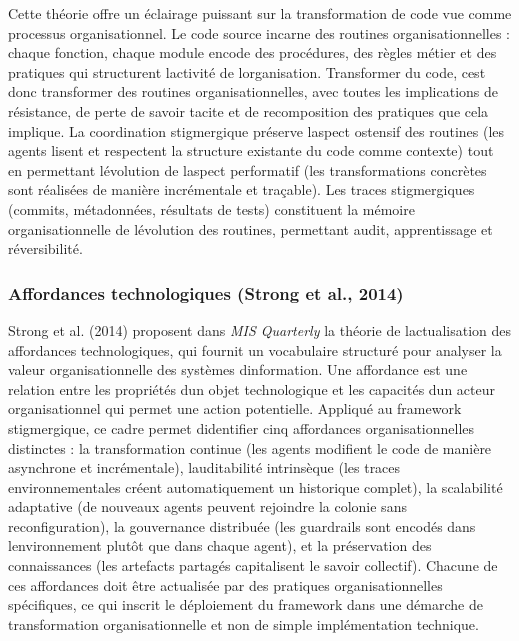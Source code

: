 \documentclass[12pt,a4paper]{article}
\begin{document}
Cette théorie offre un éclairage puissant sur la transformation de code
vue comme processus organisationnel. Le code source incarne des routines
organisationnelles : chaque fonction, chaque module encode des
procédures, des règles métier et des pratiques qui structurent
l\textquotesingle activité de l\textquotesingle organisation. Transformer
du code, c\textquotesingle est donc transformer des routines
organisationnelles, avec toutes les implications de résistance, de
perte de savoir tacite et de recomposition des pratiques que cela
implique. La coordination stigmergique préserve l\textquotesingle aspect
ostensif des routines (les agents lisent et respectent la structure
existante du code comme contexte) tout en permettant l\textquotesingle évolution
de l\textquotesingle aspect performatif (les transformations concrètes
sont réalisées de manière incrémentale et traçable). Les traces
stigmergiques (commits, métadonnées, résultats de tests) constituent
la mémoire organisationnelle de l\textquotesingle évolution des
routines, permettant audit, apprentissage et réversibilité.

\subsubsection{Affordances technologiques (Strong et al., 2014)}

Strong et al. (2014) proposent dans \emph{MIS Quarterly} la théorie de
l\textquotesingle actualisation des affordances technologiques, qui
fournit un vocabulaire structuré pour analyser la valeur
organisationnelle des systèmes d\textquotesingle information. Une
affordance est une relation entre les propriétés d\textquotesingle un
objet technologique et les capacités d\textquotesingle un acteur
organisationnel qui permet une action potentielle. Appliqué au
framework stigmergique, ce cadre permet d\textquotesingle identifier
cinq affordances organisationnelles distinctes : la transformation
continue (les agents modifient le code de manière asynchrone et
incrémentale), l\textquotesingle auditabilité intrinsèque (les traces
environnementales créent automatiquement un historique complet),
la scalabilité adaptative (de nouveaux agents peuvent rejoindre la
colonie sans reconfiguration), la gouvernance distribuée (les
guardrails sont encodés dans l\textquotesingle environnement plutôt
que dans chaque agent), et la préservation des connaissances (les
artefacts partagés capitalisent le savoir collectif). Chacune de ces
affordances doit être actualisée par des pratiques organisationnelles
spécifiques, ce qui inscrit le déploiement du framework dans une
démarche de transformation organisationnelle et non de simple
implémentation technique.
\end{document}
